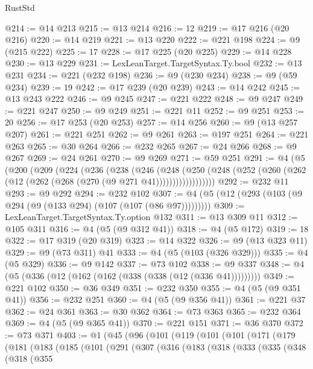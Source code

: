 \begin{lexlean}{RustStd}
\begin{coremodule}
{\begin{coremodule}
{{{{{{{{{{{{{{{{{{{{{{{{{{@214 := @14 @213
@215 := @13 @214
@216 := 12
@219 := @17 @216 (@20 @216)
@220 := @14 @219
@221 := @13 @220
@222 := @221 @198
@224 := @9 (@215 @222)
@225 := 17
@228 := @17 @225 (@20 @225)
@229 := @14 @228
@230 := @13 @229
@231 := LexLeanTarget.TargetSyntax.Ty.bool
@232 := @13 @231
@234 := @221 (@232 @198)
@236 := @9 (@230 @234)
@238 := @9 (@59 @234)
@239 := 19
@242 := @17 @239 (@20 @239)
@243 := @14 @242
@245 := @13 @243 @222
@246 := @9 @245
@247 := @221 @222
@248 := @9 @247
@249 := @221 @247
@250 := @9 @249
@251 := @221 @11
@252 := @9 @251
@253 := 20
@256 := @17 @253 (@20 @253)
@257 := @14 @256
@260 := @9 (@13 @257 @207)
@261 := @221 @251
@262 := @9 @261
@263 := @197 @251
@264 := @221 @263
@265 := @30 @264
@266 := @232 @265
@267 := @24 @266
@268 := @9 @267
@269 := @24 @261
@270 := @9 @269
@271 := @59 @251
@291 := @4
    (@5
      (@200
        (@209
          (@224
            (@236
              (@238
                (@246
                  (@248
                    (@250
                      (@248 (@252 (@260 (@262 (@12 (@262 (@268 (@270 (@9 @271 @41))))))))))))))))))
@292 := @232 @11
@293 := @9 @292
@294 := @232 @102
@307 := @4 (@5 (@12 (@293 (@103 (@9 @294 (@9 (@133 @294) (@107 (@107 (@86 @97)))))))))
@309 := LexLeanTarget.TargetSyntax.Ty.option @132
@311 := @13 @309 @11
@312 := @105 @311
@316 := @4 (@5 (@9 @312 @41))
@318 := @4 (@5 @172)
@319 := 18
@322 := @17 @319 (@20 @319)
@323 := @14 @322
@326 := @9 (@13 @323 @11)
@329 := @9 (@73 @311) @41
@333 := @4 (@5 (@103 (@326 @329)))
@335 := @4 (@5 @329)
@336 := @9 @142
@337 := @73 @102
@338 := @9 @337
@348 := @4 (@5 (@336 (@12 (@162 (@162 (@338 (@338 (@12 (@336 @41)))))))))
@349 := @221 @102
@350 := @36 @349
@351 := @232 @350
@355 := @4 (@5 (@9 @351 @41))
@356 := @232 @251
@360 := @4 (@5 (@9 @356 @41))
@361 := @221 @37
@362 := @24 @361
@363 := @30 @362
@364 := @73 @363
@365 := @232 @364
@369 := @4 (@5 (@9 @365 @41))
@370 := @221 @151
@371 := @36 @370
@372 := @73 @371
@403 := @1
    (@45
      (@96
        (@101
          (@119
            (@101
              (@101
                (@171
                  (@179
                    (@181
                      (@183
                        (@185
                          (@101
                            (@291
                              (@307
                                (@316
                                  (@183
                                    (@318
                                      (@333
                                        (@335
                                          (@348
                                            (@318
                                              (@355
}}}}}}}}}}}}}}}}}}}}}}}}}}
\end{coremodule}}
\end{coremodule}
\end{lexlean}
